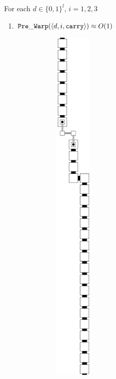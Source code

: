         For each $d \in \{0, 1\}^l$, $i = 1, 2, 3$

        \begin{enumerate}[label={--}]

            \item ${\tt Pre\_Warp}   (\langle d, i, {\tt carry}\rangle)\approx O(1)$
                \begin{figure}[H]
                    \begin{subfigure}[t]{0.2\textwidth}
                        \centering
                        \includegraphics[width=0.2\textwidth]{warping/pre_warp_general}

\end{subfigure}
\end{figure}
\end{enumerate}
